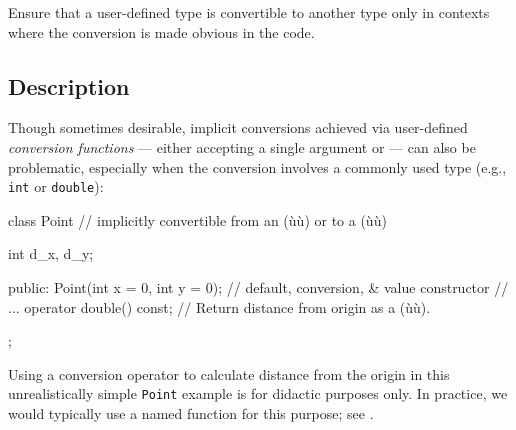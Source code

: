 
\setcounter{table}{0}
\setcounter{footnote}{0}
\setcounter{lstlisting}{0}

Ensure that a user-defined type is convertible to another type only in
contexts where the conversion is made obvious in the code.

\subsection[Description]{Description}\label{description-explicitconv}

Though sometimes desirable, implicit conversions achieved via user-defined \emph{conversion
functions} --- either  accepting a
single argument or  --- can also be problematic, especially when the
conversion involves a commonly used type (e.g., \lstinline!int! or
\lstinline!double!):

\begin{emcppslisting}[emcppsbatch=e1]
class Point  // implicitly convertible from an (ù{}ù) or to a (ù{}ù)
{
    int d_x, d_y;

public:
    Point(int x = 0, int y = 0);  // default, conversion, & value constructor
    // ...
    operator double() const;  // Return distance from origin as a (ù{}ù).
};
\end{emcppslisting}
    
\noindent Using a conversion operator to
calculate distance from the origin in this unrealistically simple \lstinline!Point!
example is for didactic purposes only. In practice, we would typically
use a named function for this purpose; see .

